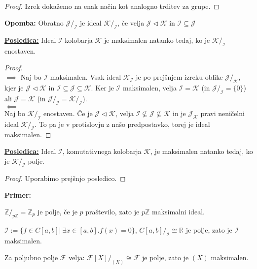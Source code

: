 \documentclass[a4paper]{article}
\newcounter{environment:definition_counter}
\newcounter{environment:theorem_counter}
\newcounter{environment:statement_counter}
\newcounter{example:example_counter}
\newenvironment{example}
{\textbf{Primer:}\\}
{\setcounter{example:example_counter}{0}}
\newenvironment{example_case}
{\refstepcounter{example:example_counter} \arabic{example:example_counter}.}
{\\}
\newenvironment{remark}
{\textbf{Opomba:}}
{}
\newenvironment{corollary}
{\underline{\textbf{Posledica:}}}
{}
\begin{document}
\begin{proof}
Izrek dokažemo na enak način kot analogno trditev za grupe.
\end{proof}

\begin{remark}
Obratno $\mathcal{J}/_{\mathcal{I}}$ je ideal $\mathcal{K}/_{\mathcal{I}}$, če velja $\mathcal{J} \triangleleft \mathcal{K}$ in $\mathcal{I} \subseteq \mathcal{J}$
\end{remark}

\begin{corollary}
Ideal $\mathcal{I}$ kolobarja $\mathcal{K}$ je maksimalen natanko tedaj, ko je $\mathcal{K}/_{\mathcal{I}}$ enostaven.
\end{corollary}

\begin{proof}\leavevmode\\
$\implies$
Naj bo $\mathcal{I}$ maksimalen. Vsak ideal $\mathcal{K}_{\mathcal{I}}$ je po prejšnjem izreku oblike $\mathcal{J}/_{\mathcal{K}}$, kjer je $\mathcal{J} \triangleleft \mathcal{K}$ in $\mathcal{I} \subseteq \mathcal{J} \subseteq \mathcal{K}$. Ker je $\mathcal{I}$ maksimalen, velja $\mathcal{I} =\mathcal{K}$ (in $\mathcal{J}/_{\mathcal{I}} = \{ 0 \}$) ali $\mathcal{J} = \mathcal{K}$ (in $\mathcal{J}/_{\mathcal{I}} = \mathcal{K}/_{\mathcal{I}}$). \\
$\impliedby$\\
Naj bo  $\mathcal{K}/_{\mathcal{I}}$ enostaven. Če je $\mathcal{J} \triangleleft \mathcal{K}$, velja $\mathcal{I} \not \subseteq \mathcal{J} \not \subseteq \mathcal{K}$ in je $\mathcal{J}_{\mathcal{K}}$ pravi neničelni ideal $\mathcal{K}/_{\mathcal{I}}$. To pa je v protislovju z našo predpostavko, torej je ideal maksimalen.
\end{proof}

\begin{corollary}
Ideal $\mathcal{I}$, komutativnega kolobarja $\mathcal{K}$, je maksimalen natanko tedaj, ko je $\mathcal{K}/_\mathcal{I}$ polje.
\end{corollary}

\begin{proof}
Uporabimo prejšnjo posledico.
\end{proof}

\begin{example}
\begin{example_case}
$\mathbb{Z}/_{p\mathbb{Z}} = \mathbb{Z}_p$ je polje, če je $p$ praštevilo, zato je $p\mathbb{Z}$ maksimalni ideal.
\end{example_case}
\begin{example_case}
$\mathcal{I} := \{ f \in C[a,b] | \ \exists x \in [a,b]. f(x) = 0 \}$, $C[a,b]/_{\mathcal{I}} \cong \mathbb{R}$ je polje, zato je $\mathcal{I}$ maksimalen. 
\end{example_case}
\begin{example_case}
Za poljubno polje $\mathcal{F}$ velja: $\mathcal{F}[X]/_{(X)} \cong \mathcal{F}$ je polje, zato je $(X)$ maksimalen.
\end{example_case}
\end{example}
\end{document}
